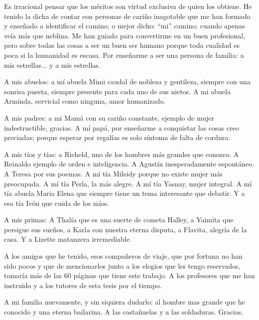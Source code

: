 \begin{acknowledgements}
Es irracional pensar que los méritos son virtud exclusiva de quien los obtiene. He tenido la dicha de contar con personas de cariño inagotable que me han formado y enseñado a identificar el camino; o mejor dicho:  ``mi'' camino; cuando apenas veía más que neblina. Me han guiado para convertirme en un buen profesional, pero sobre todas las cosas a ser un buen ser humano porque toda cualidad es poca si la humanidad es escasa. Por enseñarme a ser una persona de familia: a mis estrellas... y a mis estrellas. 

A mis abuelos: a mí abuela Mimi caudal de nobleza y gentileza, siempre con una sonrisa puesta, siempre presente para cada uno de sus nietos. A mi abuela Arminda, servicial como ninguna, amor humanizado.

A mis padres: a mi Mamá con su cariño constante, ejemplo de mujer indestructible, gracias. A mí papá, por enseñarme a conquistar las cosas creo preciadas; porque esperar por regalías es solo síntoma de falta de cordura.

A mis tíos y tías: a Richeld, uno de los hombres más grandes que conozco. A Reinaldo ejemplo de orden e inteligencia. A Agustín inesperadamente espontáneo. A Teresa por sus poemas. A mí tía Mileidy porque no existe mujer más preocupada. A mí tía Perla, la más alegre. A mí tía Yasnay, mujer integral. A mí tía abuela Maria Elena que siempre tiene un tema interesante que debatir. Y a esa tía Ivón que cuida de los míos.

A mis primas: A Thalía que es una suerte de cometa Halley, a Yaimita que persigue sus sueños, a Karla con nuestra eterna disputa, a Flavita, alegría de la casa. Y a Lizette matanzera irremediable.

A los amigos que he tenido, esos compañeros de viaje, que por fortuna no han sido pocos y que de mencionarlos junto a los elogios que les tengo reservados, tomaría más de las 60 páginas que tiene este trabajo. A los profesores que me han instruido y a los tutores de esta tesis por el tiempo.

\:

\:

A mi familia nuevamente, y sin siquiera dudarlo: al hombre mas grande que he conocido y una eterna bailarina. A las castañuelas y a las soldaduras. Gracias.
\end{acknowledgements}